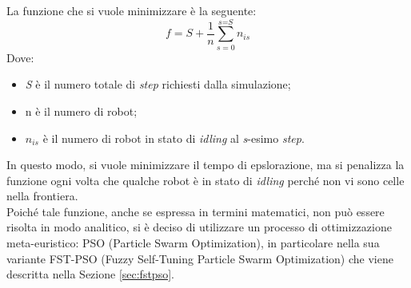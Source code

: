 La funzione che si vuole minimizzare è la seguente:
\begin{equation}
\label{math:pso}
\textit{f} = \textit{S} + \frac{1}{n}\sum_{\textit{s} = 0}^{\textit{s} = \textit{S}}n_{\textit{is}}
\end{equation}
Dove:
\begin{itemize}
	\item \textit{S} è il numero totale di \textit{step} richiesti dalla simulazione;
	\item n è il numero di robot;
	\item $n_{\textit{is}}$ è il numero di robot in stato di \textit{idling} al \textit{s}-esimo \textit{step}.
\end{itemize}
In questo modo, si vuole minimizzare il tempo di epslorazione, ma si penalizza la funzione ogni volta che qualche robot è in stato di \textit{idling} perché non vi sono celle nella frontiera.\\
Poiché tale funzione, anche se espressa in termini matematici, non può essere risolta in modo analitico, si è deciso di utilizzare un processo di ottimizzazione meta-euristico: PSO (Particle Swarm Optimization), in particolare nella sua variante FST-PSO (Fuzzy Self-Tuning Particle Swarm Optimization) \cite{nobile2018} che viene descritta nella Sezione \ref{sec:fstpso}.


